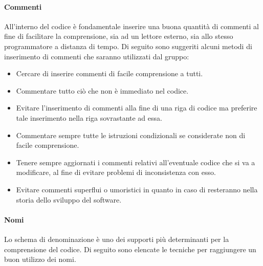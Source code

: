 \paragraph{Commenti}
All'interno del codice è fondamentale inserire una buona quantità di commenti al fine di facilitare la comprensione, sia ad un lettore esterno, sia allo stesso programmatore a distanza di tempo.
Di seguito sono suggeriti alcuni metodi di inserimento di commenti che saranno utilizzati dal gruppo:

\begin{itemize}
\item Cercare di inserire commenti di facile comprensione a tutti.

\item Commentare tutto ciò che non è immediato nel codice.

\item Evitare l'inserimento di commenti alla fine di una riga di codice ma preferire tale inserimento nella riga sovrastante ad essa.

\item Commentare sempre tutte le istruzioni condizionali se considerate non di facile comprensione.

\item Tenere sempre aggiornati i commenti relativi all'eventuale codice che si va a modificare, al fine di evitare problemi di inconsistenza con esso.

\item Evitare commenti superflui o umoristici in quanto in caso di  resteranno nella storia dello sviluppo del software.
\end{itemize}

\paragraph{Nomi}
Lo schema di denominazione è uno dei supporti più determinanti per la comprensione del codice.
Di seguito sono elencate le tecniche per raggiungere un buon utilizzo dei nomi.

